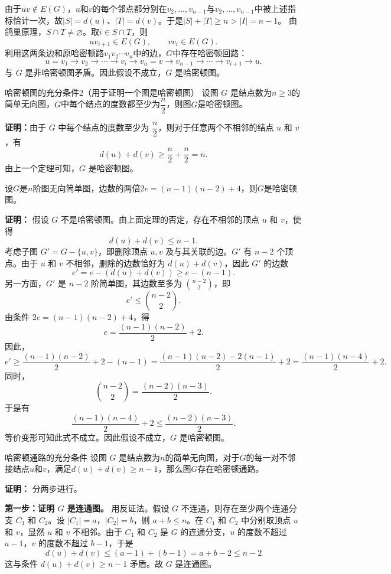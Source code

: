 \documentclass[lang=cn,11pt]{elegantbook}
\begin{document}
由于$uv\notin E(G)$，$u$和$v$的每个邻点都分别在$v_2,\ldots,v_{n-1}$与$v_2,\ldots,v_{n-1}$中被上述指标恰计一次，故$|S|=d(u)$、$|T|=d(v)$。于是$|S|+|T|\ge n>|I|=n-1$。
由鸽巢原理，$S\cap T\ne\varnothing$。取$i\in S\cap T$，则
\[
uv_{i+1}\in E(G),\qquad vv_i\in E(G).
\]
利用这两条边和原哈密顿路$v_1v_2\cdots v_n$中的边，$G$中存在哈密顿回路：
\[
u=v_1\to v_2\to\cdots\to v_i\to v_n=v\to v_{n-1}\to\cdots\to v_{i+1}\to u.
\]
与 $G$ 是非哈密顿图矛盾。因此假设不成立，$G$ 是哈密顿图。
\begin{theorem}{哈密顿图的充分条件2（用于证明一个图是哈密顿图）}
设图 $G$ 是结点数为$n\geqslant3$的简单无向图，$G$中每个结点的度数都至少为$\dfrac{n}2$，则图$G$是哈密顿图。
\end{theorem}
\textbf{证明：}由于 $G$ 中每个结点的度数至少为 $\dfrac{n}{2}$，则对于任意两个不相邻的结点 $u$ 和 $v$，有
    \[
    d(u) + d(v) \geqslant \frac{n}{2} + \frac{n}{2} = n.
    \]
由上一个定理可知，$G$ 是哈密顿图。
\begin{example}
    设$G$是$n$阶图无向简单图，边数的两倍$2e=(n-1)(n-2)+4$，则$G$是哈密顿图。
\end{example}
\textbf{证明：} 假设 $G$ 不是哈密顿图。由上面定理的否定，存在不相邻的顶点 $u$ 和 $v$，使得
    \[
    d(u) + d(v) \le n-1.
    \]
    考虑子图 $G' = G - \{u, v\}$，即删除顶点 $u, v$ 及与其关联的边。$G'$ 有 $n-2$ 个顶点。由于 $u$ 和 $v$ 不相邻，删除的边数恰好为 $d(u) + d(v)$，因此 $G'$ 的边数
    \[
    e' = e - (d(u) + d(v)) \ge e - (n-1).
    \]
    另一方面，$G'$ 是 $n-2$ 阶简单图，其边数至多为 $\binom{n-2}{2}$，即
    \[
    e' \le \binom{n-2}{2}.
    \]
    由条件 $2e = (n-1)(n-2) + 4$，得
    \[
    e = \frac{(n-1)(n-2)}{2} + 2.
    \]
    因此，
    \[
    e' \ge \frac{(n-1)(n-2)}{2} + 2 - (n-1) = \frac{(n-1)(n-2) - 2(n-1)}{2} + 2 = \frac{(n-1)(n-4)}{2} + 2.
    \]
    同时，
    \[
    \binom{n-2}{2} = \frac{(n-2)(n-3)}{2}.
    \]
    于是有
    \[
    \frac{(n-1)(n-4)}{2} + 2 \le \frac{(n-2)(n-3)}{2}.
    \]
    等价变形可知此式不成立。因此假设不成立，$G$ 是哈密顿图。
\begin{theorem}{哈密顿通路的充分条件}
    设图 $G$ 是结点数为$n$的简单无向图，对于$G$的每一对不邻接结点$u$和$v$，满足$d(u)+d(v)\geqslant n-1$，那么图$G$存在哈密顿通路。
\end{theorem}
\textbf{证明：}
    分两步进行。

    \textbf{第一步：证明 $G$ 是连通图。}
    用反证法。假设 $G$ 不连通，则存在至少两个连通分支 $C_1$ 和 $C_2$。设 $|C_1| = a$，$|C_2| = b$，则 $a + b \le n$。在 $C_1$ 和 $C_2$ 中分别取顶点 $u$ 和 $v$，显然 $u$ 和 $v$ 不相邻。由于 $C_1$ 和 $C_2$ 是 $G$ 的连通分支，$u$ 的度数不超过 $a-1$，$v$ 的度数不超过 $b-1$，于是
    \[
    d(u) + d(v) \le (a-1) + (b-1) = a + b - 2 \le n-2
    \]
    这与条件 $d(u) + d(v) \ge n-1$ 矛盾。故 $G$ 是连通图。
\end{document}
